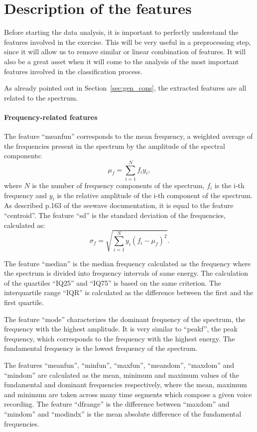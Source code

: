 \section{Description of the features}
\label{sec:feat_desc}
Before starting the data analysis, it is important to perfectly understand the features involved in the exercise. This will be very useful in a preprocessing step, since it will allow us to remove similar or linear combination of features. It will also be a great asset when it will come to the analysis of the most important features involved in the classification process.

As already pointed out in Section~\ref{sec:gen_cons}, the extracted features are all related to the spectrum. 
\paragraph{Frequency-related features}
The feature ``meanfun'' corresponds to  the mean frequency, \ie{} a weighted average of the frequencies present in the spectrum by the amplitude of the spectral components:
\begin{equation}
\mu_f = \sum\limits_{i=1}^{N} f_i y_i ,
\end{equation} 
where $N$ is the number of frequency components of the spectrum, $f_i$ is the i-th frequency and $y_i$ is the relative amplitude of the i-th component of the spectrum. 
As described p.\num{163} of the seewave documentation, it is equal to the feature ``centroid''.
The feature ``sd'' is the standard deviation of the frequencies, calculated as:
\begin{equation}
\sigma_f = \sqrt{\sum\limits_{i=1}^{N}y_i \left(f_i-\mu_f\right)^2}.
\end{equation}

The feature ``median'' is the median frequency calculated as the frequency where the spectrum is divided into frequency intervals of same energy. The calculation of the quartiles ``IQ25'' and  ``IQ75'' is based on the same criterion. The interquartile range ``IQR'' is calculated as the difference between the first and the first quartile.

The feature ``mode'' characterizes the dominant frequency of the spectrum, \ie{} the frequency with the highest amplitude. It is very similar to ``peakf'', the peak frequency, which corresponds to the frequency with the highest energy. The fundamental frequency is the lowest frequency of the spectrum.

The features ``meanfun'', ``minfun'', ``maxfun'', ``meandom'', ``maxdom'' and ``mindom'' are calculated as the mean, minimum and maximum values of the fundamental and dominant frequencies respectively, where the mean, maximum and minimum are taken across many time segments which compose a given voice recording. The feature ``dfrange'' is the difference between ``maxdom'' and ``mindom'' and ``modindx'' is the mean absolute difference of the fundamental frequencies.

